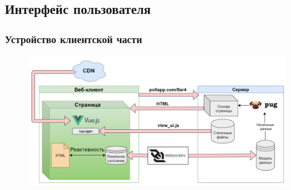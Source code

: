 \documentclass{beamer}
\begin{document}
\subsection{Интерфейс пользователя}
\begin{frame}
\frametitle{Устройство клиентской части}
\begin{figure}
	\includegraphics[width=\linewidth]{img/ui.png}
\end{figure}
\end{frame}
\end{document}
